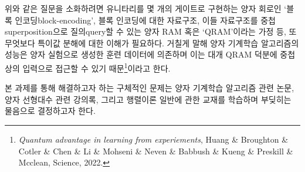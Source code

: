 \documentclass[a4paper,hidelinks]{oblivoir}
\begin{document}
위와 같은 질문을 소화하려면 유니타리를 몇 개의 게이트로 구현하는 양자 회로인 
`블록 인코딩{\footnotesize block-encoding}', 블록 인코딩에 대한 자료구조, 이들
자료구조를 중첩{\tiny superposition}으로 질의{\tiny query}할 수 있는 양자 RAM
혹은 `QRAM'이라는 가정 등, 또 무엇보다 특이값 분해에 대한 이해가 필요하다.
거칠게 말해 양자 기계학습 알고리즘의 성능은 양자 실험으로 생성한 훈련 데이터에
의존하며 이는 대개 QRAM 덕분에 중첩상의 입력으로 접근할 수 있기 
때문\footnote{\emph{Quantum advantage in learning from experiements}, Huang \&
Broughton \& Cotler \& Chen \& Li \& Mohseni \& Neven \& Babbush \& Kueng \&
Preskill \& Mcclean, Science, 2022.}이라고 한다.

본 과제를 통해 해결하고자 하는 구체적인 문제는 양자 기계학습 알고리즘 관련 논문,
양자 선형대수 관련 강의록, 그리고 행렬이론 일반에 관한 교재를 학습하며 부딪히는
물음으로 결정하고자 한다.
\end{document}

